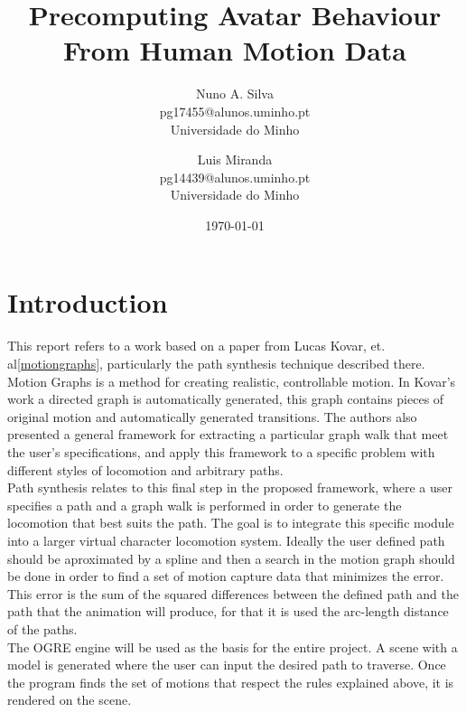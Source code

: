 \documentclass[a4paper]{article}
\title{Precomputing Avatar Behaviour From Human Motion Data}
\date{\today}
\author{
Nuno A. Silva\\ \small pg17455@alunos.uminho.pt \\ Universidade do Minho
\and
Luis Miranda\\ \small pg14439@alunos.uminho.pt \\ Universidade do Minho
}
\begin{document}
\maketitle



\section{Introduction}
This report refers to a work based on a paper from Lucas Kovar, et. al\ref{motiongraphs}, particularly the path synthesis technique described there. Motion Graphs is a method for creating realistic, controllable motion. In Kovar's work a directed graph is automatically generated, this graph contains pieces of original motion and automatically generated transitions. The authors also presented a general framework for extracting a particular graph walk that meet the user's specifications, and apply this framework to a specific problem with different styles of locomotion and arbitrary paths. \\

Path synthesis relates to this final step in the proposed framework, where a user specifies a path and a graph walk is performed in order to generate the locomotion that best suits the path. The goal is to integrate this specific module into a larger virtual character locomotion system. Ideally the user defined path should be aproximated by a spline and then a search in the motion graph should be done in order to find a set of motion capture data that minimizes the error. This error is the sum of the squared differences between the defined path and the path that the animation will produce, for that it is used the arc-length distance of the paths. \\

The OGRE engine will be used as the basis for the entire project. A scene with a model is generated where the user can input the desired path to traverse. Once the program finds the set of motions that respect the rules explained above, it is rendered on the scene.



\end{document}
